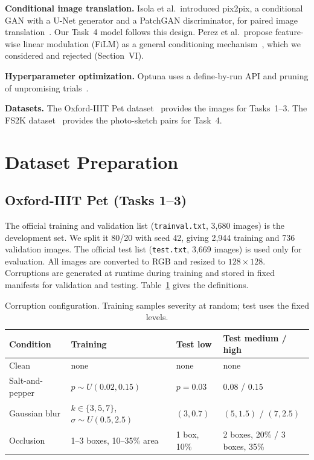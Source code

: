 \documentclass[conference]{IEEEtran}
\begin{document}
\textbf{Conditional image translation.} Isola et al.\ introduced pix2pix, a conditional GAN with a
U-Net generator and a PatchGAN discriminator, for paired image translation~\cite{isola2017pix2pix}.
Our Task~4 model follows this design. Perez et al.\ propose feature-wise linear modulation (FiLM) as
a general conditioning mechanism~\cite{perez2018film}, which we considered and rejected (Section~VI).

\textbf{Hyperparameter optimization.} Optuna uses a define-by-run API and pruning of unpromising
trials~\cite{akiba2019optuna}.

\textbf{Datasets.} The Oxford-IIIT Pet dataset~\cite{parkhi2012pets} provides the images for
Tasks~1--3. The FS2K dataset~\cite{fan2021fs2k} provides the photo-sketch pairs for Task~4.

\section{Dataset Preparation}
\subsection{Oxford-IIIT Pet (Tasks 1--3)}
The official training and validation list (\texttt{trainval.txt}, 3{,}680 images) is the
development set. We split it 80/20 with seed 42, giving 2{,}944 training and 736 validation images.
The official test list (\texttt{test.txt}, 3{,}669 images) is used only for evaluation. All images are
converted to RGB and resized to $128\times128$. Corruptions are generated at runtime during training
and stored in fixed manifests for validation and testing. Table~\ref{tab:corruptions} gives the
definitions.

\begin{table}[t]
\centering
\caption{Corruption configuration. Training samples severity at random; test uses the fixed levels.}
\label{tab:corruptions}
\begin{tabular}{@{}llll@{}}
\toprule
Condition & Training & Test low & Test medium / high \\
\midrule
Clean & none & none & none \\
Salt-and-pepper & $p\sim U(0.02,0.15)$ & $p=0.03$ & $0.08$ / $0.15$ \\
Gaussian blur & $k\in\{3,5,7\}$, $\sigma\sim U(0.5,2.5)$ & $(3,0.7)$ & $(5,1.5)$ / $(7,2.5)$ \\
Occlusion & 1--3 boxes, 10--35\% area & 1 box, 10\% & 2 boxes, 20\% / 3 boxes, 35\% \\
\bottomrule
\end{tabular}
\end{table}
\end{document}
